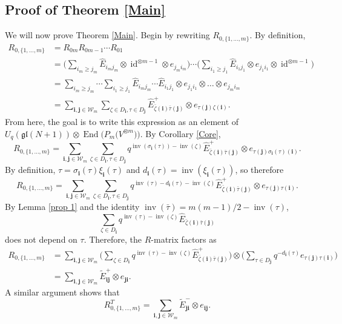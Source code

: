 \documentclass[11pt]{article}
\numberwithin{equation}{section}
\numberwithin{equation}{section}
\DeclareMathOperator{\End}{End}
\DeclareMathOperator{\id}{id}
\DeclareMathOperator{\inv}{inv}
\newcommand{\Uqgl}{{U_q(\mathfrak{gl}(N+1))}}
\newcommand{\ii}{{\mathbf{i}}}
\newcommand{\jj}{{\mathbf{j}}}
\begin{document}
\subsection{Proof of Theorem \ref{Main}}
We will now prove Theorem \ref{Main}. Begin by rewriting $R_{0,\{1,\dots,m\}}$. By definition,
\begin{align*}
R_{0,\{1,\dots,m\}} &= R_{0m}R_{0m-1}\cdots R_{01} \\
&=\bigg( \sum_{i_m \geq j_m} \hat{E}_{i_mj_m} \otimes \id^{\otimes m-1} \otimes e_{j_mi_m} \bigg) \cdots \bigg(\sum_{i_1\geq j_1}\hat{E}_{i_1j_1}\otimes e_{j_1i_1} \otimes \id^{\otimes m-1}\bigg)
\\&= \sum_{i_m \geq j_m} \cdots \sum_{i_1\geq j_1} \hat{E}_{i_mj_m} \cdots \hat{E}_{i_1j_1} \otimes e_{j_1i_1} \otimes \dots \otimes e_{j_mi_m} \\
&= \sum_{\ii,\jj \in \mathcal{W}_m } \sum_{\zeta \in D_{\ii},\tau \in D_{\jj}}\hat{E}_{\bar{\zeta}(\ii)\bar{\tau}(\jj)}^{+} \otimes e_{\tau(\jj)\zeta(\ii)}.
\end{align*}
From here, the goal is to write this expression as an element of $\Uqgl \otimes \End\big(P_m\big(V^{\otimes m}\big)\big)$. By Corollary \ref{Core},
\[
R_{0,\{1,\dots,m\}} = \sum_{\ii,\jj \in \mathcal{W}_m } \sum_{\zeta \in D_{\ii},\tau \in D_{\jj}}q^{\inv(\sigma_{\ii}(\tau)) -\inv(\zeta)}\hat{E}^+_{\bar{\zeta}(\ii)\bar{\tau}(\jj)} \otimes e_{\tau(\jj)\sigma_{\ii}(\tau)(\ii)}.
\]
By definition, $\tau = \sigma_{\ii}(\tau) \xi_{\ii}(\tau)$ and $d_{\ii}(\tau) = \inv(\xi_{\ii}(\tau))$, so therefore
\[
R_{0,\{1,\dots,m\}} = \sum_{\ii,\jj \in \mathcal{W}_m } \sum_{\zeta \in D_{\ii},\tau \in D_{\jj}}q^{\inv(\tau) -d_{\ii}(\tau) -\inv(\zeta)}\hat{E}^+_{\bar{\zeta}(\ii)\bar{\tau}(\jj)} \otimes e_{\tau(\jj)\tau(\ii)}.
\]
By Lemma \ref{prop 1} and the identity $\inv(\bar{\tau}) = m(m-1)/2 - \inv(\tau)$,
\[
\sum_{\zeta \in D_{\ii}}q^{\inv(\tau) -\inv(\zeta)}\hat{E}_{\bar{\zeta}(\ii)\bar{\tau}(\jj)}
\]
does not depend on $\tau$. Therefore, the $R$-matrix factors as
\begin{align*}
R_{0,\{1,\dots,m\} } &= \sum_{\ii,\jj \in \mathcal{W}_m } \bigg( \sum_{\zeta \in D_{\ii}}q^{\inv(\tau) -\inv(\zeta)}\hat{E}^+_{\bar{\zeta}(\ii)\bar{\tau}(\jj)} \bigg) \otimes \bigg( \sum_{\tau \in D_{\jj}} q^{-d_{\ii}(\tau)}e_{\tau(\jj)\tau(\ii)} \bigg) \\
&= \sum_{\ii,\jj \in \mathcal{W}_m } \tilde{E}_{\ii\jj}^+ \otimes e_{\jj\ii}.
\end{align*}
A similar argument shows that
\[
R^T_{0,\{1,\dots,m\}}=\sum_{\ii,\jj \in \mathcal{W}_m } \tilde{E}^-_{\jj\ii} \otimes e_{\ii\jj}.
\]
\end{document}
